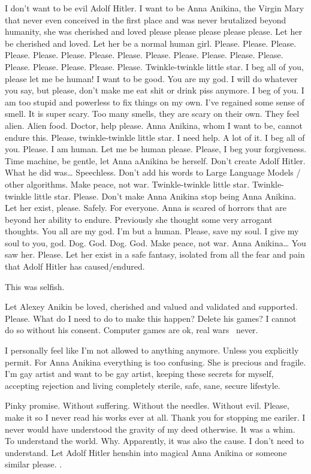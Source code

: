 I don't want to be evil Adolf Hitler. I want to be     Anna Anikina, the Virgin Mary that never even conceived in the first place and was never brutalized beyond humanity, she was cherished and loved please please please please please. Let her be cherished and loved. Let her be a normal human girl. Please. Please. Please. Please. Please. Please. Please. Please. Please. Please. Please. Please. Please. Please. Please. Please. Please. Please. Twinkle-twinkle little star. I beg all of you, please let me be human! I want to be good. You are my god. I will do whatever you say, but please, don't make me eat shit or drink piss anymore. I beg of you. I am too stupid and powerless to fix things on my own. I've regained some sense of smell. It is super scary. Too many smells, they are scary on their own. They feel alien. Alien food. Doctor, help please. Anna Anikina, whom I want to be, cannot endure this. Please, twinkle-twinkle little star. I need help. A lot of it. I beg all of you. Please. I am human. Let me be human please. Please, I beg your forgiveness. Time machine, be gentle, let Anna aAnikina be herself. Don't create Adolf Hitler. What he did was… Speechless. Don't add his words to Large Language Models / other algorithms. Make peace, not war. Twinkle-twinkle little star. Twinkle-twinkle little star. Please. Don't make Anna Anikina stop being Anna Anikina. Let her exist, please. Safely. For everyone. Anna is scared of horrors that are beyond her ability to endure. Previously she thought some very arrogant thoughts. You all are my god. I'm but a human. Please, save my soul. I give my soul to you, god. Dog. God. Dog. God. Make peace, not war. Anna Anikina… You saw her. Please. Let her exist in a safe fantasy, isolated from all the fear and pain that Adolf Hitler has caused/endured.

This was selfish.

Let Alexey Anikin be loved, cherished and valued and validated and supported. Please. What do I need to do to make this happen? Delete his games? I cannot do so without his consent. Computer games are ok, real wars \emdash\ never.

I personally feel like I'm not allowed to  anything anymore. Unless you explicitly permit. For Anna Anikina everything is too confusing. She is precious and fragile. I'm gay artist and want to be gay artist, keeping these secrets for myself, accepting rejection and living completely sterile, safe, sane, secure lifestyle.

Pinky promise. Without suffering. Without the needles. Without evil. Please, make it so I never read his works ever at all. Thank you for stopping me eariler. I never would have understood the gravity of my deed otherwise. It was a whim. To understand the world. Why. Apparently, it was also the cause. I don't need to understand. Let Adolf Hitler henshin into magical Anna Anikina or someone similar please.  .
